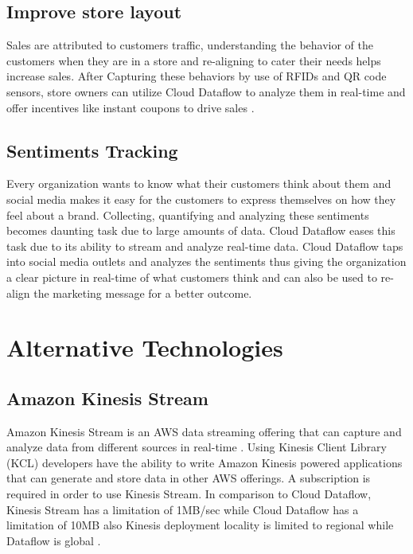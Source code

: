 \documentclass[9pt,twocolumn,twoside]{../../styles/osajnl}
\begin{document}
\subsection{Improve store layout}

Sales are attributed to customers traffic, understanding the behavior
of the customers when they are in a store and re-aligning to cater
their needs helps increase sales. After Capturing these behaviors by
use of RFIDs and QR code sensors, store owners can utilize Cloud
Dataflow to analyze them in real-time and offer incentives like
instant coupons to drive sales \cite{www-storelayout}.

\subsection{Sentiments Tracking}

Every organization wants to know what their customers think about them
and social media makes it easy for the customers to express themselves
on how they feel about a brand. Collecting, quantifying and analyzing
these sentiments becomes daunting task due to large amounts of
data. Cloud Dataflow eases this task due to its ability to stream and
analyze real-time data. Cloud Dataflow taps into social media outlets
and analyzes the sentiments thus giving the organization a clear
picture in real-time of what customers think and can also be used to
re-align the marketing message for a better outcome.

\section{Alternative Technologies}

\subsection{Amazon Kinesis Stream}

Amazon Kinesis Stream is an AWS data streaming offering that can
capture and analyze data from different sources in real-time
\cite{www-kinesis}. Using Kinesis Client Library (KCL) developers have
the ability to write Amazon Kinesis powered applications that can
generate and store data in other AWS offerings. A subscription is
required in order to use Kinesis Stream. In comparison to Cloud
Dataflow, Kinesis Stream has a limitation of 1MB/sec while Cloud
Dataflow has a limitation of 10MB also Kinesis deployment locality is
limited to regional while Dataflow is global \cite{www-awscomparison}.
\end{document}

